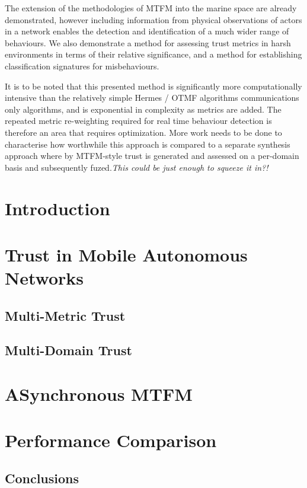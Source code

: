 \documentclass{aamas2016}
\begin{document}
The extension of the methodologies of MTFM into the marine space are already demonstrated, however including information from physical observations of actors in a network enables the detection and identification of a much wider range of behaviours.
We also demonstrate a method for assessing trust metrics in harsh environments in terms of their relative significance, and a method for establishing classification signatures for misbehaviours.

It is to be noted that this presented method is significantly more computationally intensive than the relatively simple Hermes / OTMF algorithms communications only algorithms, and is exponential in complexity as metrics are added. The repeated metric re-weighting required for real time behaviour detection is therefore an area that requires optimization. More work needs to be done to characterise how worthwhile this approach is compared to a separate synthesis approach where by MTFM-style trust is generated and assessed on a per-domain basis and subsequently fuzed.\textit{This could be just enough to squeeze it in?!}


\section{Introduction}

\section{Trust in Mobile Autonomous Networks}

\subsection{Multi-Metric Trust}

\subsection{Multi-Domain Trust}

\section{ASynchronous MTFM}

\section{Performance Comparison}

\subsection{Conclusions}
\end{document}
